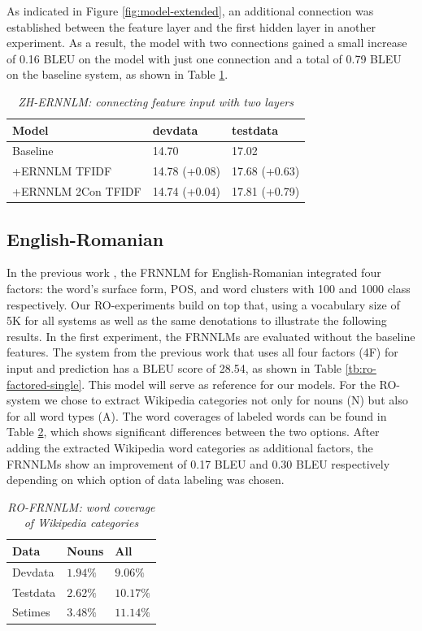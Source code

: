 \documentclass[a4paper]{article}
\begin{document}
As indicated in Figure \ref{fig:model-extended}, an additional connection was established between the feature layer and the first hidden layer in another experiment. As a result, the model with two connections gained a small increase of 0.16 BLEU on the model with just one connection and a total of 0.79 BLEU on the baseline system, as shown in Table \ref{tb:zh-extended-both}.


\begin{table}
\caption{\it ZH-ERNNLM: connecting feature input with two layers}
\vspace{2mm}
\centering
  \begin{tabular}{lll}
  	\hline
  	Model              & devdata       & testdata      \\ \hline\hline
  	Baseline           & 14.70         & 17.02         \\ \hline
  	+ERNNLM TFIDF      & 14.78 (+0.08) & 17.68 (+0.63) \\
  	+ERNNLM 2Con TFIDF & 14.74 (+0.04) & 17.81 (+0.79)
  \end{tabular}
  \label{tb:zh-extended-both}
\end{table}


\subsection{English-Romanian}
In the previous work \cite{niehuesusing}, the FRNNLM for English-Romanian integrated four factors: the word's surface form, POS, and word clusters with 100 and 1000 class respectively. Our RO-experiments build on top that, using a vocabulary size of 5K for all systems as well as the same denotations to illustrate the following results. In the first experiment, the FRNNLMs are evaluated without the baseline features. The system from the previous work that uses all four factors (4F) for input and prediction has a BLEU score of 28.54, as shown in Table \ref{tb:ro-factored-single}. This model will serve as reference for our models. For the RO-system we chose to extract Wikipedia categories not only for nouns (N) but also for all word types (A). The word coverages of labeled words can be found in Table \ref{tb:ro-word-coverage}, which shows significant differences between the two options.
After adding the extracted Wikipedia word categories as additional factors, the FRNNLMs show an improvement of 0.17 BLEU and 0.30 BLEU respectively depending on which option of data labeling was chosen.

\begin{table}
\caption{\it RO-FRNNLM: word coverage of Wikipedia categories}
\vspace{2mm}
\centering
  \begin{tabular}{lll}
  	\hline
  	Data     & Nouns     & All        \\ \hline\hline
  	Devdata  & $1.94 \%$ & $9.06 \%$  \\
  	Testdata & $2.62 \%$ & $10.17 \%$ \\ \hline
  	Setimes  & $3.48 \%$ & $11.14 \%$
  \end{tabular}
  \label{tb:ro-word-coverage}
\end{table}
\end{document}
